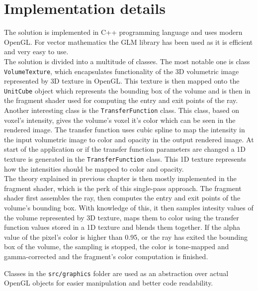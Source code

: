 \documentclass[a4paper, 12pt]{article}
\begin{document}

\section{Implementation details}
The solution is implemented in C++ programming language and uses modern OpenGL. For vector mathematics the GLM library has been used as it is efficient and very easy to use. \\
The solution is divided into a multitude of classes. The most notable one is class \texttt{VolumeTexture}, which encapsulates functionality of the 3D volumetric image represented
by 3D texture in OpenGL. This texture is then mapped onto the \texttt{UnitCube} object which represents the bounding box of the volume and is then in the fragment shader used for
computing the entry and exit points of the ray. \\
Another interesting class is the \texttt{TransferFunction} class. This class, based on voxel's intensity, gives the volume's voxel it's color which can be seen 
in the rendered image. The transfer function uses cubic spline to map the intensity in the input volumetric image to color and opacity in the output rendered image. At start of the application or if the
transfer function parameters are changed a 1D texture is generated in the \texttt{TransferFunction} class. This 1D texture represents how the intensities should be mapped to color and opacity.\\
The theory explained in previous chapter is then mostly implemented in the fragment shader, which is the perk of this single-pass approach. The fragment shader first assembles the
ray, then computes the entry and exit points of the volume's bounding box. With knowledge of this, it then samples intesity values of the volume represented by 3D texture, maps them
to color using the transfer function values stored in a 1D texture and blends them together. If the alpha value of the pixel's color is higher than 0.95, or the ray has exited the 
bounding box of the volume, the sampling is stopped, the color is tone-mapped and gamma-corrected and the fragment's color computation is finished. \\ 
\pagebreak

Classes in the \texttt{src/graphics} folder are used as an abstraction over actual OpenGL objects for easier manipulation and better code readability.


\end{document}
